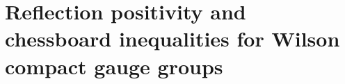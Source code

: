 \section{Reflection positivity and chessboard inequalities for Wilson compact gauge groups}
\label{app:RP_Wilson}


